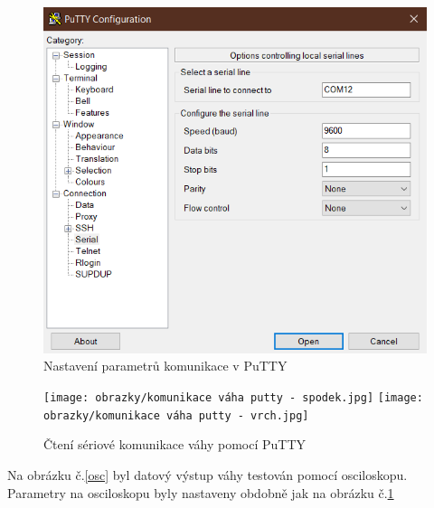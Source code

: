 \begin{figure}[H]
    \begin{center}
        \includegraphics[scale=0.8]{obrazky/nastaveni putty.png}
    \end{center}
    \caption{Nastavení parametrů komunikace v PuTTY}
    \label{putty}
\end{figure}

\begin{figure}[H]
    \begin{center}
        \texttt{[image: obrazky/komunikace váha putty - spodek.jpg]}
        \texttt{[image: obrazky/komunikace váha putty - vrch.jpg]}
    \end{center}
    \caption{Čtení sériové komunikace váhy pomocí PuTTY}
    \label{puttyyyy}
\end{figure}

Na obrázku č.\ref{osc} byl datový výstup váhy testován pomocí osciloskopu. Parametry na osciloskopu byly nastaveny obdobně jak na obrázku č.\ref{putty}

